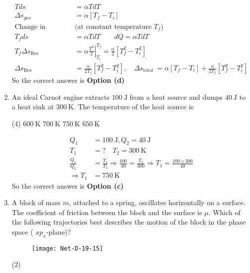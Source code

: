 \begin{enumerate}
\begin{answer}
\begin{align*}
	T d s&=\alpha T d T \\
	\Delta s_{g a s}&=\alpha\left[T_{f}-T_{i}\right]\\
	\text{Change in entropy of reservoir }&\text{(at constant temperature $T_f$)}\\
	T_{f} d s&=\alpha T d T \qquad d Q=\alpha T d T\\
	T_{f} \Delta s_{\mathrm{Res}}&=\left.\alpha \frac{T^{2}}{2}\right|_{T_{i}} ^{T_{f}}=\frac{\alpha}{2}\left[T_{f}^{2}-T_{i}^{2}\right] \\
	\Delta s_{\mathrm{Res}}&=\frac{\alpha}{2 T_{f}}\left[T_{f}^{2}-T_{i}^{2}\right], \quad \Delta s_{\text {total }}=\alpha\left[T_{f}-T_{i}\right]+\frac{\alpha}{2 T_{f}}\left[T_{f}^{2}-T_{i}^{2}\right]
	\end{align*}
		So the correct answer is \textbf{Option (d)}
\end{answer}
\item An ideal Carnot engine extracts $100 \mathrm{~J}$ from a heat source and dumps $40 \mathrm{~J}$ to a heat sink at $300 \mathrm{~K}$. The temperature of the heat source is
 \begin{tasks}(4)
	\task[\textbf{a.}]$600 \mathrm{~K}$
	\task[\textbf{b.}]$700 \mathrm{~K}$
	\task[\textbf{c.}] $750 \mathrm{~K}$
	\task[\textbf{d.}] $650 \mathrm{~K}$
\end{tasks}
\begin{answer}
	\begin{align*}
	Q_{1}&=100 \mathrm{~J}, Q_{2}=40 \mathrm{~J}\\
	T_{1}&=? \quad T_{2}=300 \mathrm{~K} \\
	\frac{Q_{1}}{Q_{2}}&=\frac{T_{1}}{T_{2}} \Rightarrow \frac{100}{40}=\frac{T_{1}}{300} \Rightarrow T_{1}=\frac{100 \times 300}{40} \\
	\Rightarrow T_{1}&=750 \mathrm{~K}
	\end{align*}
		So the correct answer is \textbf{Option (c)}
\end{answer}
\item A block of mass $m$, attached to a spring, oscillates horizontally on a surface. The coefficient of friction between the block and the surface is $\mu$. Which of the following trajectories best describes the motion of the block in the phase space ( $x p_{x}$-plane)?	
\begin{figure}[H]
	\centering
	\texttt{[image: Net-D-19-15]}
\end{figure}
 \begin{tasks}(2)
	\task[\textbf{a.}]
	\begin{figure}[H]

\end{figure}
\end{tasks}
\end{enumerate}
